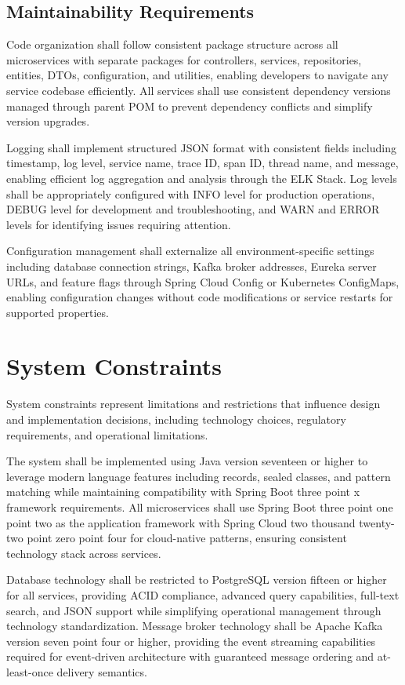 \subsection{Maintainability Requirements}

Code organization shall follow consistent package structure across all microservices with separate packages for controllers, services, repositories, entities, DTOs, configuration, and utilities, enabling developers to navigate any service codebase efficiently. All services shall use consistent dependency versions managed through parent POM to prevent dependency conflicts and simplify version upgrades.

Logging shall implement structured JSON format with consistent fields including timestamp, log level, service name, trace ID, span ID, thread name, and message, enabling efficient log aggregation and analysis through the ELK Stack. Log levels shall be appropriately configured with INFO level for production operations, DEBUG level for development and troubleshooting, and WARN and ERROR levels for identifying issues requiring attention.

Configuration management shall externalize all environment-specific settings including database connection strings, Kafka broker addresses, Eureka server URLs, and feature flags through Spring Cloud Config or Kubernetes ConfigMaps, enabling configuration changes without code modifications or service restarts for supported properties.

\section{System Constraints}

System constraints represent limitations and restrictions that influence design and implementation decisions, including technology choices, regulatory requirements, and operational limitations.

The system shall be implemented using Java version seventeen or higher to leverage modern language features including records, sealed classes, and pattern matching while maintaining compatibility with Spring Boot three point x framework requirements. All microservices shall use Spring Boot three point one point two as the application framework with Spring Cloud two thousand twenty-two point zero point four for cloud-native patterns, ensuring consistent technology stack across services.

Database technology shall be restricted to PostgreSQL version fifteen or higher for all services, providing ACID compliance, advanced query capabilities, full-text search, and JSON support while simplifying operational management through technology standardization. Message broker technology shall be Apache Kafka version seven point four or higher, providing the event streaming capabilities required for event-driven architecture with guaranteed message ordering and at-least-once delivery semantics.

